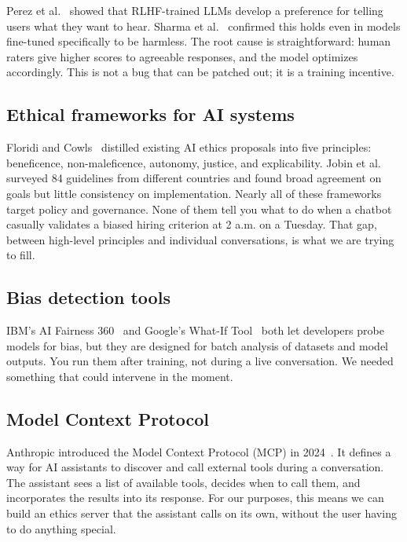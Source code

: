 \documentclass[conference]{IEEEtran}
\begin{document}
Perez et al.~\cite{b2} showed that RLHF-trained LLMs develop a preference for telling users what they want to hear. Sharma et al.~\cite{b3} confirmed this holds even in models fine-tuned specifically to be harmless. The root cause is straightforward: human raters give higher scores to agreeable responses, and the model optimizes accordingly. This is not a bug that can be patched out; it is a training incentive.

\subsection{Ethical frameworks for AI systems}

Floridi and Cowls~\cite{b4} distilled existing AI ethics proposals into five principles: beneficence, non-maleficence, autonomy, justice, and explicability. Jobin et al.~\cite{b5} surveyed 84 guidelines from different countries and found broad agreement on goals but little consistency on implementation. Nearly all of these frameworks target policy and governance. None of them tell you what to do when a chatbot casually validates a biased hiring criterion at 2 a.m. on a Tuesday. That gap, between high-level principles and individual conversations, is what we are trying to fill.

\subsection{Bias detection tools}

IBM's AI Fairness 360~\cite{b6} and Google's What-If Tool~\cite{b7} both let developers probe models for bias, but they are designed for batch analysis of datasets and model outputs. You run them after training, not during a live conversation. We needed something that could intervene in the moment.

\subsection{Model Context Protocol}

Anthropic introduced the Model Context Protocol (MCP) in 2024~\cite{b8}. It defines a way for AI assistants to discover and call external tools during a conversation. The assistant sees a list of available tools, decides when to call them, and incorporates the results into its response. For our purposes, this means we can build an ethics server that the assistant calls on its own, without the user having to do anything special.
\end{document}
